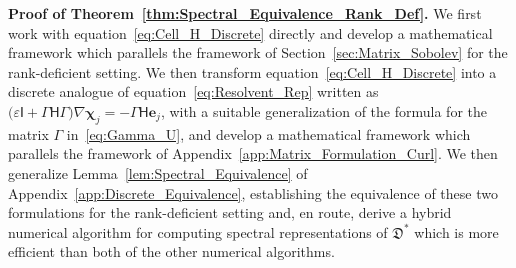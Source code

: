 \documentclass[english,12pt,jmp,graphicx]{revtex4-1}
\newcommand{\vece}{\boldsymbol{e}}
\newcommand{\thmref}[1]{Theorem~\ref{#1}}
\newcommand{\lemref}[1]{Lemma~\ref{#1}}
\newcommand{\secref}[1]{Section~\ref{#1}}
\newcommand{\appref}[1]{Appendix~\ref{#1}}
\newcommand{\Dg}{\mathfrak{D}}
\newcommand{\vecchi}{\boldsymbol{\chi}}
\newcommand{\Hm}{\mathsf{H}}
\newcommand{\Ib}{\mathsf{I}}
\begin{document}
% 

\noindent\textbf{Proof of \thmref{thm:Spectral_Equivalence_Rank_Def}.}
%
We first work with equation~\eqref{eq:Cell_H_Discrete} directly and
develop a mathematical framework which parallels the framework of
\secref{sec:Matrix_Sobolev} for the rank-deficient setting. We then
transform equation~\eqref{eq:Cell_H_Discrete} into a discrete analogue
of equation~\eqref{eq:Resolvent_Rep} written as
$\big(\varepsilon\Ib+\Gamma\Hm\Gamma\big)\nabla\vecchi_j=-\Gamma\Hm\vece_j$,
with a suitable 
generalization of the formula for the matrix $\Gamma$ 
in~\eqref{eq:Gamma_U}, and develop a mathematical framework 
which parallels the framework of \appref{app:Matrix_Formulation_Curl}. We
then generalize \lemref{lem:Spectral_Equivalence} of
\appref{app:Discrete_Equivalence}, establishing the equivalence of
these two formulations for the rank-deficient setting and, en route,
derive a hybrid numerical algorithm for computing spectral
representations of $\Dg^*$ which is more efficient than both of the
other numerical algorithms.  
\end{document}
